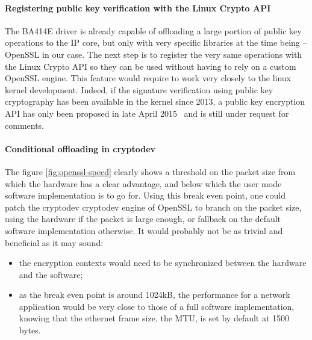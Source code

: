 \paragraph{Registering public key verification with the Linux Crypto API}
The BA414E driver is already capable of offloading a large portion of public key operations to the IP core, but only with very specific libraries at the time being -- OpenSSL in our case.
The next step is to register the very same operations with the Linux Crypto API so they can be used without having to rely on a custom OpenSSL engine.
This feature would require to work very closely to the linux kernel development.
Indeed, if the signature verification using public key cryptography has been available in the kernel since 2013, a public key encryption API has only been proposed in late April 2015~\cite{crypto-api-pk-encryption} and is still under request for comments.

\paragraph{Conditional offloading in cryptodev}
The figure \ref{fig:openssl-speed} clearly shows a threshold on the packet size from which the hardware has a clear advantage, and below which the user mode software implementation is to go for.
Using this break even point, one could patch the cryptodev cryptodev engine of OpenSSL to branch on the packet size, using the hardware if the packet is large enough, or fallback on the default software implementation otherwise. %
It would probably not be as trivial and beneficial as it may sound:
\begin{itemize}
	\item the encryption contexts would need to be synchronized between the hardware and the software;
	\item as the break even point is around 1024kB, the performance for a network application would be very close to those of a full software implementation, knowing that the ethernet frame size, the MTU, is set by default at 1500 bytes.
\end{itemize}

